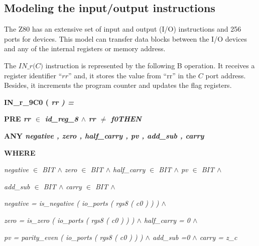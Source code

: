 \documentclass[a4paper]{llncs}
\newcommand{\footnoterecall}[1]{
  \footnotemark[\value{#1}]
}
\begin{document}
\subsection{Modeling the input/output instructions}
\label{sec:modelingIO}
The Z80 has an extensive set of input and output (I/O) instructions and 256 ports for
devices. This model can transfer data blocks between the I/O devices and any
of the internal registers or memory address.

The $\textit{IN\_r(C)}$\footnoterecall{myfootnote} instruction is represented
by the following B operation. It receives a register identifier ``$\textit{rr}$'' and, it stores the value from ``rr'' in the $\textit{C}$ port address. Besides, it increments the program counter and updates the flag registers.

\hspace*{0.0in}\bf IN\_r\_9C0 \rm ( \it rr \rm ) \rm =

\hspace*{0.0in}\bf PRE \it rr  $\in$  \it id\_reg\_8  $\land$  \it rr  $\not =$  \it f0\hspace*{0.15in}\bf THEN

\hspace*{0.20in}\bf ANY \hspace*{0.10in}\it negative \rm , \it zero \rm , \it half\_carry \rm , \it pv \rm , \it add\_sub \rm , \it carry

\hspace*{0.20in}\bf WHERE 

\hspace*{0.40in}\it negative $\in$ \it BIT $\land$ \it zero $\in$ \it BIT $\land$ \it half\_carry $\in$ \it BIT 
$\land$ \it pv $\in$ \it BIT $\land$

 \hspace*{0.40in}\it add\_sub $\in$ \it BIT $\land$ \it carry $\in$ \it BIT  $\land$

\hspace*{0.40in}\it negative \rm = \it is\_negative \rm ( \it io\_ports \rm ( \it rgs8 \rm ( \it c0 \rm ) \rm ) \rm )  $\land$ 

\hspace*{0.40in}\it zero \rm = \it is\_zero \rm ( \it io\_ports \rm ( \it rgs8 \rm ( \it c0 \rm ) \rm ) \rm )  $\land$ \it half\_carry \rm = \rm 0  $\land$ 

\hspace*{0.40in}\it pv \rm = \it parity\_even \rm ( \it io\_ports \rm ( \it rgs8 \rm ( \it c0 \rm ) \rm ) \rm ) $\land$
\it add\_sub \rm =\hspace*{0.10in}\rm 0  $\land$ 
\it carry \rm = \it z\_c
\end{document}
